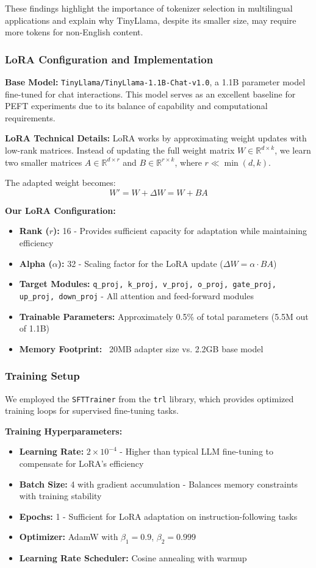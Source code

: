 These findings highlight the importance of tokenizer selection in multilingual applications and explain why TinyLlama, despite its smaller size, may require more tokens for non-English content.

\subsubsection{LoRA Configuration and Implementation}
\textbf{Base Model:} \texttt{TinyLlama/TinyLlama-1.1B-Chat-v1.0}, a 1.1B parameter model fine-tuned for chat interactions. This model serves as an excellent baseline for PEFT experiments due to its balance of capability and computational requirements.

\textbf{LoRA Technical Details:}
LoRA works by approximating weight updates with low-rank matrices. Instead of updating the full weight matrix $W \in \mathbb{R}^{d \times k}$, we learn two smaller matrices $A \in \mathbb{R}^{d \times r}$ and $B \in \mathbb{R}^{r \times k}$, where $r \ll \min(d, k)$.

The adapted weight becomes:
\[W' = W + \Delta W = W + BA\]

\textbf{Our LoRA Configuration:}
\begin{itemize}
    \item \textbf{Rank ($r$):} 16 - Provides sufficient capacity for adaptation while maintaining efficiency
    \item \textbf{Alpha ($\alpha$):} 32 - Scaling factor for the LoRA update ($\Delta W = \alpha \cdot BA$)
    \item \textbf{Target Modules:} \texttt{q\_proj, k\_proj, v\_proj, o\_proj, gate\_proj, up\_proj, down\_proj} - All attention and feed-forward modules
    \item \textbf{Trainable Parameters:} Approximately 0.5\% of total parameters (5.5M out of 1.1B)
    \item \textbf{Memory Footprint:} ~20MB adapter size vs. 2.2GB base model
\end{itemize}

\subsubsection{Training Setup}
We employed the \texttt{SFTTrainer} from the \texttt{trl} library, which provides optimized training loops for supervised fine-tuning tasks.

\textbf{Training Hyperparameters:}
\begin{itemize}
    \item \textbf{Learning Rate:} $2 \times 10^{-4}$ - Higher than typical LLM fine-tuning to compensate for LoRA's efficiency
    \item \textbf{Batch Size:} 4 with gradient accumulation - Balances memory constraints with training stability
    \item \textbf{Epochs:} 1 - Sufficient for LoRA adaptation on instruction-following tasks
    \item \textbf{Optimizer:} AdamW with $\beta_1 = 0.9$, $\beta_2 = 0.999$
    \item \textbf{Learning Rate Scheduler:} Cosine annealing with warmup
\end{itemize}

